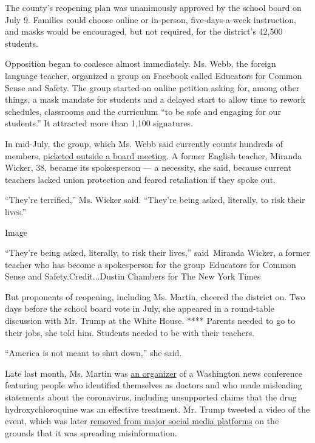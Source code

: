 The county's reopening plan was unanimously approved by the school board
on July 9. Families could choose online or in-person, five-days-a-week
instruction, and masks would be encouraged, but not required, for the
district's 42,500 students.

Opposition began to coalesce almost immediately. Ms. Webb, the foreign
language teacher, organized a group on Facebook called Educators for
Common Sense and Safety. The group started an online petition asking
for, among other things, a mask mandate for students and a delayed start
to allow time to rework schedules, classrooms and the curriculum ``to be
safe and engaging for our students.'' It attracted more than 1,100
signatures.

In mid-July, the group, which Ms. Webb said currently counts hundreds of
members,
\href{https://www.gpb.org/news/2020/07/16/crowd-protests-cherokee-county-school-system-reopening-demands-mask-mandate}{picketed
outside a board meeting}. A former English teacher, Miranda Wicker, 38,
became its spokesperson --- a necessity, she said, because current
teachers lacked union protection and feared retaliation if they spoke
out.

``They're terrified,'' Ms. Wicker said. ``They're being asked,
literally, to risk their lives.''

Image

``They're being asked, literally, to risk their lives,'' said~Miranda
Wicker, a former teacher who has become a spokesperson for the
group~Educators for Common Sense and Safety.Credit...Dustin Chambers for
The New York Times

But proponents of reopening, including Ms. Martin, cheered the district
on. Two days before the school board vote in July, she appeared in a
round-table discussion with Mr. Trump at the White House. **** Parents
needed to go to their jobs, she told him. Students needed to be with
their teachers.

``America is not meant to shut down,'' she said.

Late last month, Ms. Martin was
\href{https://www.nbcnews.com/tech/social-media/dark-money-pac-s-coordinated-reopen-push-are-behind-doctors-n1235100}{an
organizer} of a Washington news conference featuring people who
identified themselves as doctors and who made misleading statements
about the coronavirus, including unsupported claims that the drug
hydroxychloroquine was an effective treatment. Mr. Trump tweeted a video
of the event, which was later
\href{https://www.nytimes3xbfgragh.onion/2020/07/28/technology/virus-video-trump.html}{removed
from major social media platforms} on the grounds that it was spreading
misinformation.

